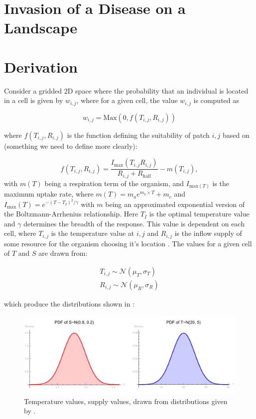 \documentclass[11pt]{article}
\begin{document}
\section{Invasion of a Disease on a Landscape}

\section{Derivation}

Consider a gridded 2D space where the probability that an individual is located in a cell is given by $w_{i,j}$, where for a given cell, the value $w_{i,j}$ is computed as 

\begin{equation}
    w_{i,j} = \text{Max}(0, f(T_{i,j}, R_{i,j}))
\end{equation}

where $f(T_{i,j}, R_{i,j})$ is the function defining the suitability of patch $i,j$ based on (something we need to define more clearly):

\begin{equation}
    f(T_{i,j}, R_{i,j}) = \frac{I_{\text{max}}(T_{i,j} R_{i,j})}{R_{i,j} + R_{\text{half}}} - m(T_{i,j}),
\end{equation}
with $m(T)$ being a respiration term of the organism, and $I_{\text{max}(T)}$ is the maximum uptake rate, where $m(T) = m_a e^{m_b \times T} + m_c$ and $I_{\text{max}}(T) = e^{-(T - T_I)^2 / \gamma}$ with $m$ being an approximated exponential version of the Boltzmann-Arrhenius relationship. Here $T_I$ is the optimal temperature value and $\gamma$ determines the breadth of the response. This value is dependent on each cell, where $T_{i,j}$ is the temperature value at $i,j$ and $R_{i,j}$ is the inflow supply of some resource for the organism choosing it's location . The values for a given cell of $T$ and $S$ are drawn from: 

\begin{align} \label{eq:s-t}
    T_{i,j} \sim \mathcal{N}(\mu_T, \sigma_T) \\
    R_{i,j} \sim \mathcal{N}(\mu_R, \sigma_R)
\end{align}

which produce the distributions shown in :

\begin{figure}[!hpt]
    \centering
    \includegraphics[width=0.9\linewidth]{figs/temp-supply-wij-pdfs.pdf}
    \caption{Temperature values, supply values, drawn from distributions given by .}
    \label{fig:t-s-wij-pdfs}
\end{figure}
\end{document}
